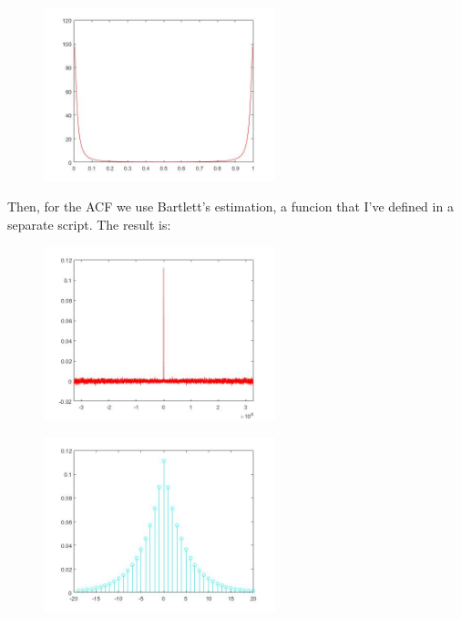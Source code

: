 \documentclass[a4paper,11pt]{article}
\begin{document}
\begin{figure}[!hp]
    \begin{center}
    \includegraphics[width=0.6\textwidth]{images/lab1_figure1_3.jpg}
    \end{center}
\end{figure}

Then, for the ACF we use Bartlett's estimation, a funcion that I've defined in a separate script. The result is:

\begin{figure}[!hp]
    \begin{center}
    \includegraphics[width=0.6\textwidth]{images/lab2_figure3.jpg}
    \end{center}
\end{figure}

\newpage

\begin{figure}[!hp]
    \begin{center}
    \includegraphics[width=0.6\textwidth]{images/lab2_figure2.jpg}
    \end{center}
\end{figure}
\end{document}
